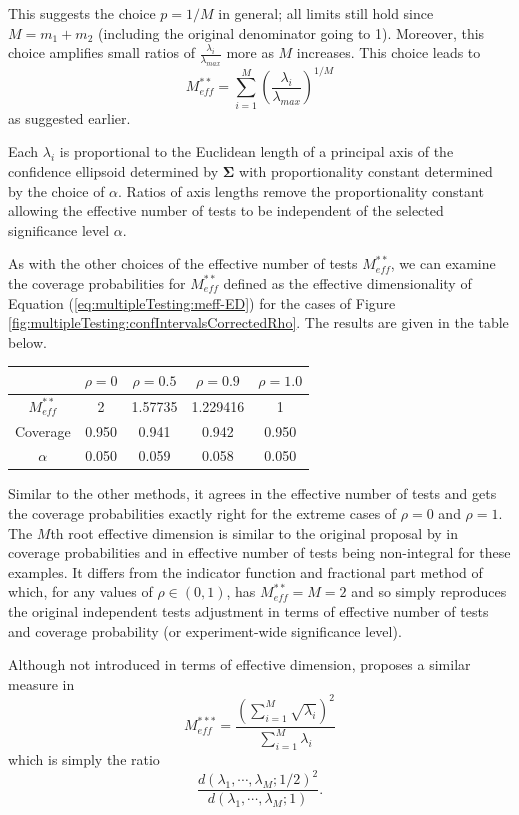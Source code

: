 \documentclass[letterpaper,12pt,oneside,final]{article}
\newcommand{\sm}[1]{\boldsymbol{#1}}   %
\begin{document}
This suggests the choice $ p = 1/M$ in general; all limits still hold since $M = m_1 + m_2$ (including the original denominator going to 1). Moreover, this choice amplifies small ratios of $\frac{\lambda_i}{\lambda_{max}}$ more as $M$ increases.  This choice leads to
\[
M_{eff}^{**} = \sum_{i = 1}^M  \left( \frac{\lambda_i}{\lambda_{max}}\right)^{1/M}
\]
as suggested earlier.

Each $\lambda_i$ is proportional to the Euclidean length of a principal axis of the confidence ellipsoid determined by $\sm{\Sigma}$ with proportionality constant determined by the choice of $\alpha$.  Ratios of axis lengths remove the proportionality constant allowing the effective number of tests to be independent of the selected significance level $\alpha$.

As with the other choices of  the effective number of tests $M_{eff}^{**}$, we can examine the coverage probabilities for $M_{eff}^{**}$ defined as the effective dimensionality of Equation (\ref{eq:multipleTesting:meff-ED}) for the cases of Figure \ref{fig:multipleTesting:confIntervalsCorrectedRho}. The results are given
in the table below.
\begin{center}
\begin{tabular}{c|cccc}
& 
$\rho = 0$ &
$\rho = 0.5$ &
$\rho = 0.9$ &
$\rho = 1.0$ \\
\hline
$M_{eff}^{**}$ & 
2 &
1.57735 &
1.229416 &
1
\\
Coverage  &
0.950 &
0.941&
0.942 &
0.950 
\\
$\alpha$  &
0.050 &
0.059 &
0.058 &
0.050
\end{tabular}
\end{center}
Similar to the other methods, it agrees in the effective number of tests and gets the coverage probabilities exactly right for the extreme cases of $\rho = 0$ and $\rho = 1$.  The $M$th  root effective dimension is similar to the original proposal by \cite{cheverud2001} in coverage probabilities and in effective number of tests being non-integral for  these examples.  It differs from the indicator function and fractional part method of \cite{LiJi2005} which, for any values of $\rho \in (0,1)$,  has  $M_{eff}^{**} = M = 2$ and so simply reproduces the original independent tests adjustment in terms of effective number of tests and coverage probability (or experiment-wide significance level).

Although not introduced in terms of effective dimension, \cite{Galwey2009} proposes a similar measure in
\begin{equation}
  M_{eff}^{***} = \frac{ \left ( \sum_{i=1}^M \sqrt{\lambda_i} \right )^2}{\sum_{i=1}^M \lambda_i}
  \label{eq:multipleTesting:galwey}
\end{equation}
which is simply the ratio
$$\frac{d(\lambda_1, \cdots, \lambda_M; 1/2)^2}{d(\lambda_1, \cdots, \lambda_M; 1)}.$$
\end{document}
